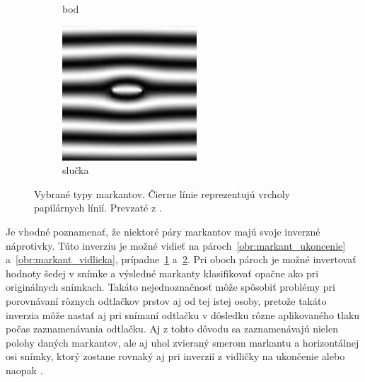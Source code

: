 \begin{figure}[h]
\begin{subfigure}[b]{0.19\linewidth}
      \caption{bod}
      \label{obr:markant_bod}
    \end{subfigure}
    \hfill
    \begin{subfigure}[b]{0.19\linewidth}
      \includegraphics[width=\linewidth]{obrazky-figures/markanty/slucka.png}
      \caption{slučka}
      \label{obr:markant_slucka}
    \end{subfigure}
    \caption{Vybrané typy markantov. Čierne línie reprezentujú vrcholy papilárnych línií. Prevzaté z \cite{Drahansky}.}
    \label{obr:typy_markantov}
  \end{figure}

  Je vhodné poznamenať, že niektoré páry markantov majú svoje inverzné náprotivky. Túto inverziu je možné vidieť na pároch~{\ref{obr:markant_ukoncenie}}
  a~{\ref{obr:markant_vidlicka}}, prípadne~{\ref{obr:markant_bod}} a~{\ref{obr:markant_slucka}}. Pri oboch pároch je možné invertovať
  hodnoty šedej v snímke a výsledné markanty klasifikovať opačne ako pri originálnych snímkach. Takáto nejednoznačnosť môže spôsobiť problémy pri porovnávaní
  rôznych odtlačkov prstov aj od tej istej osoby, pretože takáto inverzia môže nastať aj pri snímaní odtlačku v dôsledku rôzne aplikovaného tlaku počas
  zaznamenávania odtlačku. Aj z tohto dôvodu sa zaznamenávajú nielen polohy daných markantov, ale aj uhol zvieraný smerom markantu a horizontálnej osi
  snímky, ktorý zostane rovnaký aj pri inverzií z vidličky na ukončenie alebo naopak \cite{Handbook}.

